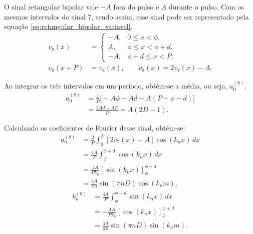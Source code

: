 O sinal retangular bipolar vale $-A$ fora do pulso e $A$ durante o pulso.
Com os mesmos intervalos do sinal 7, sendo assim, esse sinal pode ser representado 
pela equação \ref{eq:retangular_bipolar_variavel}.
\begin{equation}
    \begin{aligned}
        v_8(x)&=\begin{cases}
            -A, & 0\leq x<\phi, \\
            A, & \phi\leq x<\phi+d, \\
            -A, & \phi+d\leq x<P,
        \end{cases} \\
        v_8(x+P)&=v_8(x), \qquad v_8(x)=2v_7(x)-A.
    \end{aligned}
    \label{eq:retangular_bipolar_variavel}
\end{equation}

Ao integrar os três intervalos em um período, obtém-se a média, ou seja, $a_0^{(8)}$. 
\begin{equation}
    \begin{aligned}
        a_0^{(8)}&=\frac{1}{P}\biggl[
            -A\phi+Ad-A(P-\phi-d)\biggr] \\
            &=\frac{2Ad-AP}{P}=A(2D-1).
    \end{aligned}
\end{equation}

Calculando os coeficientes de Fourier desse sinal, obtém-se:
\begin{equation}
    \begin{aligned}
        a_n^{(8)}&=\frac{2}{P}\int_0^P[2v_7(x)-A]\cos(k_nx)\,dx \\
            &=\frac{4A}{P}\int_\phi^{\phi+d}\cos(k_nx)\,dx \\
            &=\frac{4A}{Pk_n}[\sin(k_nx)]_\phi^{\phi+d} \\
            &=\frac{4A}{\pi n}\sin(\pi nD)\cos(k_nm),
    \end{aligned}
\end{equation}
\begin{equation}
    \begin{aligned}
        b_n^{(8)}&=\frac{4A}{P}\int_\phi^{\phi+d}\sin(k_nx)\,dx \\
            &=-\frac{4A}{Pk_n}[\cos(k_nx)]_\phi^{\phi+d} \\
            &=\frac{4A}{\pi n}\sin(\pi nD)\sin(k_nm).
    \end{aligned}
\end{equation}

